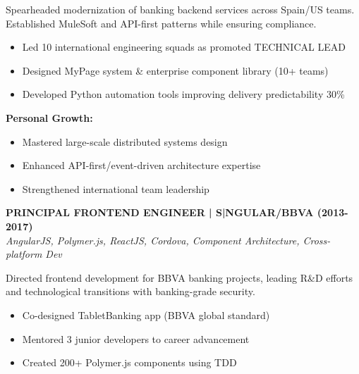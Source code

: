 \documentclass[a4paper,10pt]{article}
\begin{document}
\begin{minipage}{\textwidth}
	Spearheaded modernization of banking backend services across Spain/US teams. Established MuleSoft and API-first patterns while ensuring compliance.

	\vspace{0.2cm}
	\begin{itemize}[label=\textcolor{darkblue}{\textbullet}, leftmargin=*, nosep]
		\item Led 10 international engineering squads as promoted TECHNICAL LEAD
		\item Designed MyPage system \& enterprise component library (10+ teams)
		\item Developed Python automation tools improving delivery predictability 30\%
	\end{itemize}

	\vspace{0.2cm}
	\textbf{Personal Growth:}
	\vspace{0.2cm}
	\begin{itemize}[label=\textcolor{darkblue}{\textbullet}, leftmargin=*, nosep]
		\item Mastered large-scale distributed systems design
		\item Enhanced API-first/event-driven architecture expertise
		\item Strengthened international team leadership
	\end{itemize}

	\vspace{0.4cm}

	\noindent\textbf{PRINCIPAL FRONTEND ENGINEER | S|NGULAR/BBVA (2013-2017)} \\
	\vspace{0.1cm}
	{\small\textit{AngularJS, Polymer.js, ReactJS, Cordova, Component Architecture, Cross-platform Dev}}
	\vspace{0.2cm}

	Directed frontend development for BBVA banking projects, leading R\&D efforts and technological transitions with banking-grade security.

	\vspace{0.2cm}
	\begin{itemize}[label=\textcolor{darkblue}{\textbullet}, leftmargin=*, nosep]
		\item Co-designed TabletBanking app (BBVA global standard)
		\item Mentored 3 junior developers to career advancement
		\item Created 200+ Polymer.js components using TDD
	\end{itemize}


\end{minipage}
\end{document}
